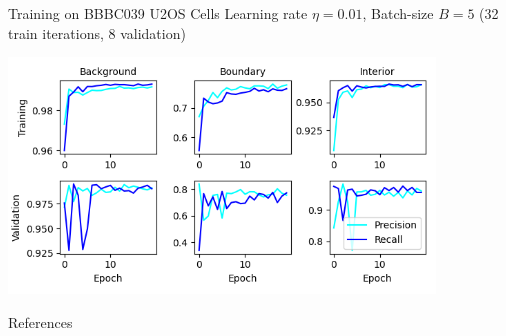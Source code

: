 \documentclass[aspectratio=1610]{beamer}					%
\begin{document}
\begin{frame}{Training on BBBC039 U2OS Cells}
Learning rate $\eta=0.01$, Batch-size $B=5$ (32 train iterations, 8 validation)
\begin{center}
\includegraphics[width=0.85\textwidth]{metrics.png}
\end{center}

\end{frame}



\begin{frame}[allowframebreaks]{References}
	\tiny
	
\end{frame}
\end{document}
